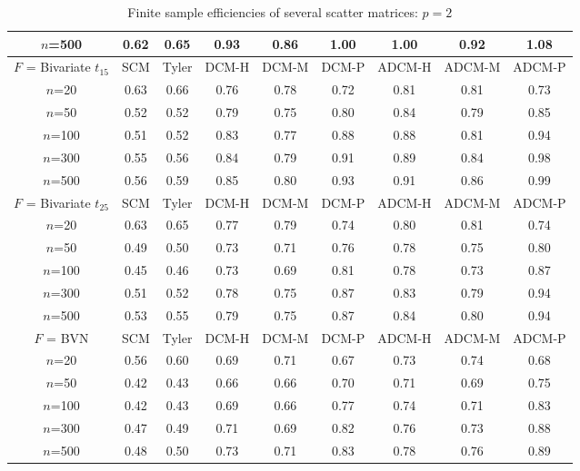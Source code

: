 \begin{table}[t]
\begin{scriptsize}
\begin{tabular}{c|cc|ccc|ccc}
    $n$=500                  & 0.62 & 0.65  & 0.93   & 0.86   & 1.00  & 1.00    & 0.92    & 1.08   \\ \hline
    $F$ = Bivariate $t_{15}$ & SCM  & Tyler & DCM-H & DCM-M & DCM-P & ADCM-H & ADCM-M & ADCM-P \\ \hline
    $n$=20                   & 0.63 & 0.66  & 0.76   & 0.78   & 0.72  & 0.81    & 0.81    & 0.73   \\
    $n$=50                   & 0.52 & 0.52  & 0.79   & 0.75   & 0.80  & 0.84    & 0.79    & 0.85   \\
    $n$=100                  & 0.51 & 0.52  & 0.83   & 0.77   & 0.88  & 0.88    & 0.81    & 0.94   \\
    $n$=300                  & 0.55 & 0.56  & 0.84   & 0.79   & 0.91  & 0.89    & 0.84    & 0.98   \\
    $n$=500                  & 0.56 & 0.59  & 0.85   & 0.80   & 0.93  & 0.91    & 0.86    & 0.99   \\ \hline
    $F$ = Bivariate $t_{25}$ & SCM  & Tyler & DCM-H & DCM-M & DCM-P & ADCM-H & ADCM-M & ADCM-P \\ \hline
    $n$=20                   & 0.63 & 0.65  & 0.77   & 0.79   & 0.74  & 0.80    & 0.81    & 0.74   \\
    $n$=50                   & 0.49 & 0.50  & 0.73   & 0.71   & 0.76  & 0.78    & 0.75    & 0.80   \\
    $n$=100                  & 0.45 & 0.46  & 0.73   & 0.69   & 0.81  & 0.78    & 0.73    & 0.87   \\
    $n$=300                  & 0.51 & 0.52  & 0.78   & 0.75   & 0.87  & 0.83    & 0.79    & 0.94   \\
    $n$=500                  & 0.53 & 0.55  & 0.79   & 0.75   & 0.87  & 0.84    & 0.80    & 0.94   \\ \hline
    $F$ = BVN                & SCM  & Tyler & DCM-H & DCM-M & DCM-P & ADCM-H & ADCM-M & ADCM-P \\ \hline
    $n$=20                   & 0.56 & 0.60  & 0.69   & 0.71   & 0.67  & 0.73    & 0.74    & 0.68   \\
    $n$=50                   & 0.42 & 0.43  & 0.66   & 0.66   & 0.70  & 0.71    & 0.69    & 0.75   \\
    $n$=100                  & 0.42 & 0.43  & 0.69   & 0.66   & 0.77  & 0.74    & 0.71    & 0.83   \\
    $n$=300                  & 0.47 & 0.49  & 0.71   & 0.69   & 0.82  & 0.76    & 0.73    & 0.88   \\
    $n$=500                  & 0.48 & 0.50  & 0.73   & 0.71   & 0.83  & 0.78    & 0.76    & 0.89   \\ \hline
    \end{tabular}
\end{scriptsize}
\caption{Finite sample efficiencies of several scatter matrices: $p=2$}
\label{table:FSEtable2}
\end{table}

